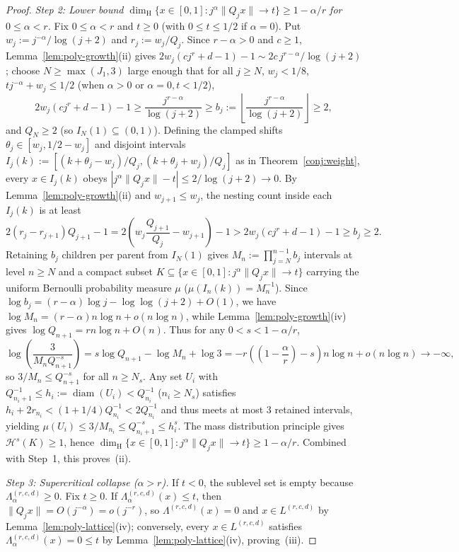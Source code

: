 \documentclass[11pt]{article}
\theoremstyle{definition}
\theoremstyle{remark}
\newcommand{\dimH}{\dim_{\mathrm{H}}}
\newcommand{\Lam}{\Lambda}
\begin{document}
\begin{proof}
\emph{Step 2: Lower bound $\dimH\{x\in[0,1]:j^\alpha\|Q_jx\|\to t\}\ge1-\alpha/r$
for $0\le\alpha<r$.} Fix $0\le\alpha<r$ and $t\ge0$ (with $0\le t\le1/2$ if
$\alpha=0$). Put $w_j:=j^{-\alpha}/\log(j+2)$ and $r_j:=w_j/Q_j$. Since
$r-\alpha>0$ and $c\ge1$, Lemma~\ref{lem:poly-growth}(ii) gives
$2w_j(cj^r+d-1)-1\sim2c\,j^{r-\alpha}/\log(j+2)$; choose $N\ge\max(J_1,3)$ large
enough that for all $j\ge N$, $w_j<1/8$, $tj^{-\alpha}+w_j\le1/2$ (when
$\alpha>0$ or $\alpha=0,t<1/2$),
\[
2w_j(cj^r+d-1)-1\ge\frac{j^{r-\alpha}}{\log(j+2)}\ge b_j:=\left\lfloor\frac{j^{r-\alpha}}{\log(j+2)}\right\rfloor\ge2,
\]
and $Q_N\ge2$ (so $I_N(1)\subseteq(0,1)$). Defining the clamped shifts
$\theta_j\in[w_j,1/2-w_j]$ and disjoint intervals
$I_j(k):=[(k+\theta_j-w_j)/Q_j,(k+\theta_j+w_j)/Q_j]$ as in
Theorem~\ref{conj:weight}, every $x\in I_j(k)$ obeys
$|j^\alpha\|Q_jx\|-t|\le2/\log(j+2)\to0$. By Lemma~\ref{lem:poly-growth}(ii)
and $w_{j+1}\le w_j$, the nesting count inside each $I_j(k)$ is at least
\[
2(r_j-r_{j+1})Q_{j+1}-1=2\left(w_j\frac{Q_{j+1}}{Q_j}-w_{j+1}\right)-1
>2w_j(cj^r+d-1)-1\ge b_j\ge2.
\]
Retaining $b_j$ children per parent from $I_N(1)$ gives
$M_n:=\prod_{j=N}^{n-1}b_j$ intervals at level $n\ge N$ and a compact subset
$K\subseteq\{x\in[0,1]:j^\alpha\|Q_jx\|\to t\}$ carrying the uniform Bernoulli
probability measure $\mu$ ($\mu(I_n(k))=M_n^{-1}$). Since
$\log b_j=(r-\alpha)\log j-\log\log(j+2)+O(1)$, we have
$\log M_n=(r-\alpha)n\log n+o(n\log n)$, while Lemma~\ref{lem:poly-growth}(iv)
gives $\log Q_{n+1}=rn\log n+O(n)$. Thus for any $0<s<1-\alpha/r$,
\[
\log\left(\frac{3}{M_nQ_{n+1}^{-s}}\right)
=s\log Q_{n+1}-\log M_n+\log3
=-r\left(\left(1-\frac{\alpha}{r}\right)-s\right)n\log n+o(n\log n)\longrightarrow-\infty,
\]
so $3/M_n\le Q_{n+1}^{-s}$ for all $n\ge N_s$. Any set $U_i$ with
$Q_{n_i+1}^{-1}\le h_i:=\operatorname{diam}(U_i)<Q_{n_i}^{-1}$ ($n_i\ge N_s$)
satisfies $h_i+2r_{n_i}<(1+1/4)Q_{n_i}^{-1}<2Q_{n_i}^{-1}$ and thus meets at
most $3$ retained intervals, yielding $\mu(U_i)\le3/M_{n_i}\le Q_{n_i+1}^{-s}\le h_i^s$.
The mass distribution principle gives $\mathcal H^s(K)\ge1$, hence
$\dimH\{x\in[0,1]:j^\alpha\|Q_jx\|\to t\}\ge1-\alpha/r$. Combined with Step~1,
this proves~(ii).

\emph{Step 3: Supercritical collapse ($\alpha>r$).} If $t<0$, the sublevel set
is empty because $\Lam_\alpha^{(r,c,d)}\ge0$. Fix $t\ge0$. If
$\Lam_\alpha^{(r,c,d)}(x)\le t$, then $\|Q_jx\|=O(j^{-\alpha})=o(j^{-r})$, so
$\Lam^{(r,c,d)}(x)=0$ and $x\in L^{(r,c,d)}$ by Lemma~\ref{lem:poly-lattice}(iv);
conversely, every $x\in L^{(r,c,d)}$ satisfies $\Lam_\alpha^{(r,c,d)}(x)=0\le t$
by Lemma~\ref{lem:poly-lattice}(iv), proving~(iii).
\end{proof}
\end{document}
